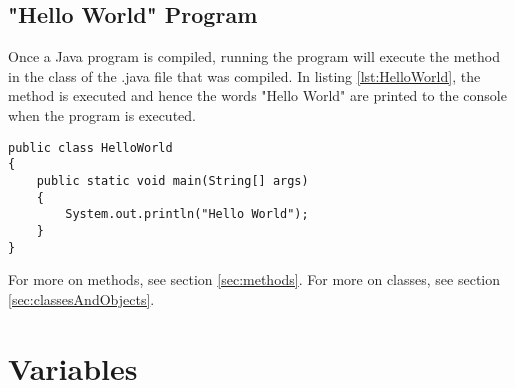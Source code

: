 \documentclass[11pt]{article}
\begin{document}
\subsection{"Hello World" Program}
Once a Java program is compiled, running the program will execute the method in the class of the .java file that was compiled. In listing \ref{lst:HelloWorld}, the  method is executed and hence the words "Hello World" are printed to the console when the program is executed.
\begin{lstlisting}[caption=Hello World, label=lst:HelloWorld]
public class HelloWorld
{
    public static void main(String[] args)
    {
        System.out.println("Hello World");
    }
}
\end{lstlisting}
For more on methods, see section \ref{sec:methods}. For more on classes, see section \ref{sec:classesAndObjects}.

\pagebreak
\section{Variables}
\end{document}
